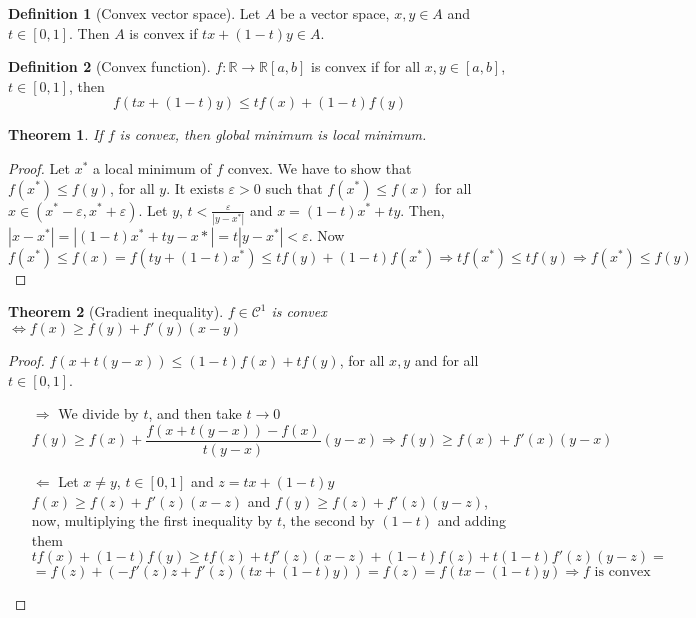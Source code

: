 \documentclass{article}
\newcommand{\Al}{\Leftarrow}
\newcommand{\Ar}{\Rightarrow}
\newcommand{\fOnR}[1]{#1 : \mathbb{R} \rightarrow \mathbb{R}}
\newcommand{\intcc}[1]{\left[#1\right]}
\newcommand{\intoo}[1]{\left(#1\right)}
\theoremstyle{definition}
\newtheorem{definition}{Definition}[section]
\theoremstyle{definition}
\theoremstyle{plain}
\newtheorem{theorem}{Theorem}[section]
\theoremstyle{plain}
\theoremstyle{plain}
\theoremstyle{plain}
\theoremstyle{definition}
\theoremstyle{remark}
\theoremstyle{remark}
\theoremstyle{remark}
\theoremstyle{remark}
\newcommand{\C}{\mathcal{C}}
\newcommand{\E}{\varepsilon}
\begin{document}
\begin{definition}[Convex vector space]
  Let $A$ be a vector space, $x,y \in A$ and $t \in \intcc{0,1}$. Then $A$ is convex if $tx + (1-t)y \in A$.
\end{definition}


\begin{definition}[Convex function]
  $\fOnR{f}{\intcc{a,b}}$ is convex if for all $x,y \in \intcc{a,b}$, $t \in \intcc{0,1}$, then
  \[
  f(tx+(1-t)y) \leq tf(x) + (1-t)f(y)
  \]
\end{definition}


\begin{theorem}
  If $f$ is convex, then global minimum is local minimum.
\end{theorem}

\begin{proof}
  Let $x^*$ a local minimum of $f$ convex. We have to show that $f(x^*) \leq f(y)$, for all $y$. It exists $\E > 0$ such that $f(x^*) \leq f(x)$ for all $x \in \intoo{x^*-\E,x^*+\E}$. Let $y$, $t < \frac{\E}{|y-x^*|}$ and $x = (1-t)x^* + ty$. Then, $|x-x^*| = |(1-t)x^*+ty-x*| = t|y-x^*| < \E$. Now
  \[
  f(x^*) \leq f(x) = f(ty+(1-t)x^*) \leq tf(y) + (1-t)f(x^*) \Ar
  tf(x^*) \leq tf(y) \Ar
  f(x^*) \leq f(y)
  \]
\end{proof}


\begin{theorem}[Gradient inequality]
  $f \in \C^1$ is convex $\iff f(x) \geq f(y) + f'(y)(x-y)$
\end{theorem}

\begin{proof}
  $f(x+t(y-x)) \leq (1-t)f(x) + tf(y)$, for all $x,y$ and for all $t \in \intcc{0,1}$.
  \begin{itemize}
  \item[$\Ar$] We divide by $t$, and then take $t \to 0$
    \[
    f(y) \geq f(x) + \frac{f(x+t(y-x)) - f(x)}{t(y-x)}(y-x) \Ar
    f(y) \geq f(x) + f'(x)(y-x)
    \]
  \item[$\Al$] Let $x \neq y$, $t \in \intcc{0,1}$ and $z = tx+(1-t)y$ $f(x) \geq f(z) + f'(z)(x-z)$ and $f(y) \geq f(z) + f'(z)(y-z)$, now, multiplying the first inequality by $t$, the second by $(1-t)$ and adding them
    \[
    tf(x) + (1-t)f(y) \geq tf(z) + tf'(z)(x-z) + (1-t)f(z) + t(1-t)f'(z)(y-z)=
    \]
    \[ =
    f(z) + (-f'(z)z + f'(z)(tx+(1-t)y)) = f(z) = f(tx-(1-t)y) \Ar
    f \text{ is convex}
    \]
  \end{itemize}
\end{proof}
\end{document}

